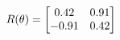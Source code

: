 \documentclass[preview]{standalone}
\begin{document}
\begin{align*}
\special{dvisvgm:raw <g id='unique000'>}R(\theta) = \begin{bmatrix}0.42 & 0.91\\-0.91 & 0.42\end{bmatrix}\special{dvisvgm:raw </g>}
\end{align*}
\end{document}
